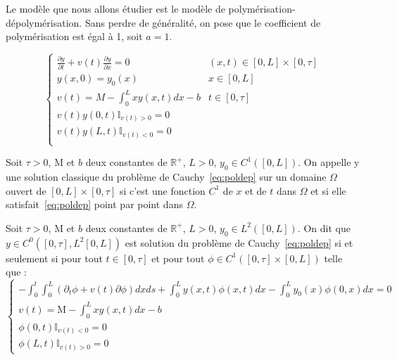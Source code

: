 \documentclass[a4paper]{article}
\newcommand{\mass}{\mathrm{M}}
\newcommand{\pol}{a}
\newcommand{\dep}{b}
\begin{document}
Le modèle que nous allons étudier est le modèle de polymérisation-dépolymérisation. 
Sans perdre de généralité, 
on pose que le coefficient de polymérisation est égal à 1, 
soit $\pol =1$.

\begin{equation}
		\label{eq:poldep}
		\begin{cases}
			\displaystyle \frac{\partial y}{\partial t}+ v(t) \frac{\partial y} {\partial x}  = 0 & (x,t) \in [0,L] \times [0, \tau] \\
             y(x,0) = y_{0} (x) & x\in[0,L]\\
			 v(t) = M - \int_0^L x y(x,t)dx - \dep & t \in [0,\tau]\\
			 v(t)y(0,t)\mathbb{I}_{v(t) > 0} = 0 \\
			 v(t)y(L,t)\mathbb{I}_{v(t) < 0} = 0 \\
		\end{cases}
\end{equation}

\begin{definition}
	Soit $\tau>0$, $\mass$ et $\dep$ deux constantes de $\mathbb{R}^+$, $L>0$, $y_0 \in C^1([0,L])$.
	On appelle y une solution classique du problème de Cauchy~\eqref{eq:poldep} 
	sur un domaine $\Omega$ ouvert de $[0,L] \times [0, \tau]$ 
	si c'est une fonction $C^1$ de $x$ et de $t$ dans $\Omega$ 
	et si elle satisfait~\eqref{eq:poldep} point par point dans $\Omega$.
\end{definition}

\begin{definition}
	\label{def:cauchy}
	Soit $\tau>0$, $\mass$ et $\dep$ deux constantes de $\mathbb{R}^+$, 
	$L>0$, $y_0 \in L^2([0,L])$.
	On dit que $y \in C^0([0,\tau],L^2[0,L])$ est solution du problème de Cauchy~\eqref{eq:poldep}  
	si et seulement si pour tout $t \in [0,\tau]$ et pour
	tout $\phi \in C^1([0,\tau]\times [0,L])$ telle que :
	\begin{equation}
		\begin{cases}
			-\int_0^t \int_0^L (\partial_t \phi +v(t)\partial \phi) dxds 
			+ \int_0^L y(x,t) \phi (x,t) dx - \int_0^L y_0(x)\phi(0,x)dx =0 \\
			v(t) = \mass - \int_0^L xy(x,t)dx -\dep\\
			\phi(0,t) \mathbb{I}_{v(t)<0}=0 \\
			\phi(L,t) \mathbb{I}_{v(t)>0}=0 
		\end{cases}
	\end{equation}
\end{definition}
\end{document}
